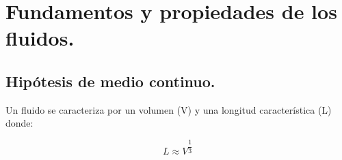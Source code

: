 
\chapter{Fundamentos y propiedades de los fluidos.}
	\section{Hipótesis de medio continuo.}
Un fluido se caracteriza por un volumen (V) y una longitud característica (L) donde:

\[L \approx V^{\dfrac{1}{3}}\]

%	

